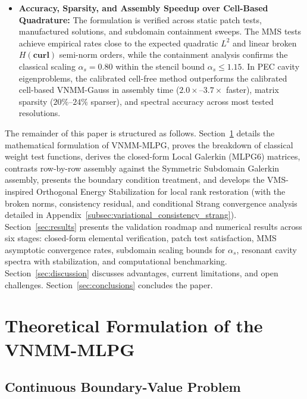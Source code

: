 \documentclass[VANCOUVER,Times1COL]{WileyNJD-v5}
\begin{document}
\begin{itemize}
    \item \textbf{Accuracy, Sparsity, and Assembly Speedup over Cell-Based Quadrature:} The formulation is verified across static patch tests, manufactured solutions, and subdomain containment sweeps. The MMS tests achieve empirical rates close to the expected quadratic $L^2$ and linear broken $H(\mathbf{curl})$ semi-norm orders, while the containment analysis confirms the classical scaling $\alpha_s = 0.80$ \cite{atluri2002meshless, liu2009mesh} within the stencil bound $\alpha_s \le 1.15$. In PEC cavity eigenproblems, the calibrated cell-free method outperforms the calibrated cell-based VNMM-Gauss in assembly time ($2.0\times\text{--}3.7\times$ faster), matrix sparsity ($20\%\text{--}24\%$ sparser), and spectral accuracy across most tested resolutions.
\end{itemize}

The remainder of this paper is structured as follows. Section~\ref{sec:formulation} details the mathematical formulation of VNMM-MLPG, proves the breakdown of classical weight test functions, derives the closed-form Local Galerkin (MLPG6) matrices, contrasts row-by-row assembly against the Symmetric Subdomain Galerkin assembly, presents the boundary condition treatment, and develops the VMS-inspired Orthogonal Energy Stabilization for local rank restoration (with the broken norms, consistency residual, and conditional Strang convergence analysis detailed in Appendix~\ref{subsec:variational_consistency_strang}). Section~\ref{sec:results} presents the validation roadmap and numerical results across six stages: closed-form elemental verification, patch test satisfaction, MMS asymptotic convergence rates, subdomain scaling bounds for $\alpha_s$, resonant cavity spectra with stabilization, and computational benchmarking. Section~\ref{sec:discussion} discusses advantages, current limitations, and open challenges. Section~\ref{sec:conclusions} concludes the paper.

\section{Theoretical Formulation of the VNMM-MLPG}
\label{sec:formulation}

\subsection{Continuous Boundary-Value Problem}
\label{subsec:continuous_bvp}
\end{document}
